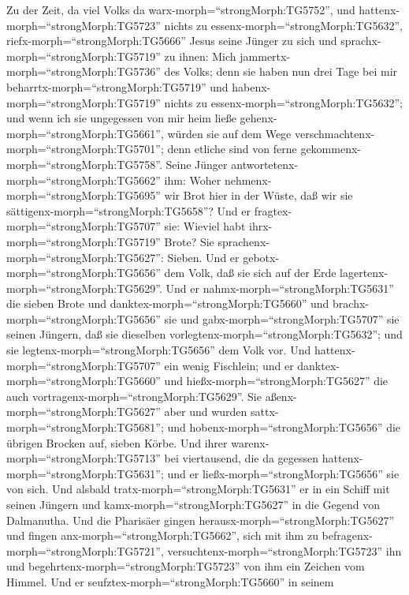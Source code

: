  Zu der Zeit, da viel Volks da
warx-morph=``strongMorph:TG5752'', und
hattenx-morph=``strongMorph:TG5723'' nichts zu
essenx-morph=``strongMorph:TG5632'', riefx-morph=``strongMorph:TG5666''
Jesus seine Jünger zu sich und sprachx-morph=``strongMorph:TG5719'' zu
ihnen:  Mich jammertx-morph=``strongMorph:TG5736'' des
Volks; denn sie haben nun drei Tage bei mir
beharrtx-morph=``strongMorph:TG5719'' und
habenx-morph=``strongMorph:TG5719'' nichts zu
essenx-morph=``strongMorph:TG5632'';  und wenn ich sie
ungegessen von mir heim ließe gehenx-morph=``strongMorph:TG5661'',
würden sie auf dem Wege verschmachtenx-morph=``strongMorph:TG5701'';
denn etliche sind von ferne gekommenx-morph=``strongMorph:TG5758''.
 Seine Jünger antwortetenx-morph=``strongMorph:TG5662'' ihm:
Woher nehmenx-morph=``strongMorph:TG5695'' wir Brot hier in der Wüste,
daß wir sie sättigenx-morph=``strongMorph:TG5658''?  Und er
fragtex-morph=``strongMorph:TG5707'' sie: Wieviel habt
ihrx-morph=``strongMorph:TG5719'' Brote? Sie
sprachenx-morph=``strongMorph:TG5627'': Sieben.  Und er
gebotx-morph=``strongMorph:TG5656'' dem Volk, daß sie sich auf der Erde
lagertenx-morph=``strongMorph:TG5629''. Und er
nahmx-morph=``strongMorph:TG5631'' die sieben Brote und
danktex-morph=``strongMorph:TG5660'' und
brachx-morph=``strongMorph:TG5656'' sie und
gabx-morph=``strongMorph:TG5707'' sie seinen Jüngern, daß sie dieselben
vorlegtenx-morph=``strongMorph:TG5632''; und sie
legtenx-morph=``strongMorph:TG5656'' dem Volk vor.  Und
hattenx-morph=``strongMorph:TG5707'' ein wenig Fischlein; und er
danktex-morph=``strongMorph:TG5660'' und
hießx-morph=``strongMorph:TG5627'' die auch
vortragenx-morph=``strongMorph:TG5629''.  Sie
aßenx-morph=``strongMorph:TG5627'' aber und wurden
sattx-morph=``strongMorph:TG5681''; und
hobenx-morph=``strongMorph:TG5656'' die übrigen Brocken auf, sieben
Körbe.  Und ihrer warenx-morph=``strongMorph:TG5713'' bei
viertausend, die da gegessen hattenx-morph=``strongMorph:TG5631''; und
er ließx-morph=``strongMorph:TG5656'' sie von sich.  Und
alsbald tratx-morph=``strongMorph:TG5631'' er in ein Schiff mit seinen
Jüngern und kamx-morph=``strongMorph:TG5627'' in die Gegend von
Dalmanutha.  Und die Pharisäer gingen
herausx-morph=``strongMorph:TG5627'' und fingen
anx-morph=``strongMorph:TG5662'', sich mit ihm zu
befragenx-morph=``strongMorph:TG5721'',
versuchtenx-morph=``strongMorph:TG5723'' ihn und
begehrtenx-morph=``strongMorph:TG5723'' von ihm ein Zeichen vom Himmel.
 Und er seufztex-morph=``strongMorph:TG5660'' in seinem

